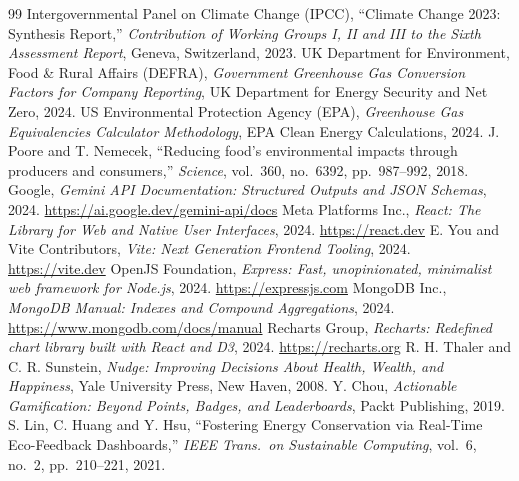 \documentclass[12pt,a4paper]{article}
\begin{document}
\begin{thebibliography}{99}
 Intergovernmental Panel on Climate Change (IPCC), ``Climate Change 2023: Synthesis Report,'' \emph{Contribution of Working Groups I, II and III to the Sixth Assessment Report}, Geneva, Switzerland, 2023.
 UK Department for Environment, Food \& Rural Affairs (DEFRA), \emph{Government Greenhouse Gas Conversion Factors for Company Reporting}, UK Department for Energy Security and Net Zero, 2024.
 US Environmental Protection Agency (EPA), \emph{Greenhouse Gas Equivalencies Calculator Methodology}, EPA Clean Energy Calculations, 2024.
 J. Poore and T. Nemecek, ``Reducing food's environmental impacts through producers and consumers,'' \emph{Science}, vol.\ 360, no.\ 6392, pp.\ 987--992, 2018.
 Google, \emph{Gemini API Documentation: Structured Outputs and JSON Schemas}, 2024. \url{https://ai.google.dev/gemini-api/docs}
 Meta Platforms Inc., \emph{React: The Library for Web and Native User Interfaces}, 2024. \url{https://react.dev}
 E. You and Vite Contributors, \emph{Vite: Next Generation Frontend Tooling}, 2024. \url{https://vite.dev}
 OpenJS Foundation, \emph{Express: Fast, unopinionated, minimalist web framework for Node.js}, 2024. \url{https://expressjs.com}
 MongoDB Inc., \emph{MongoDB Manual: Indexes and Compound Aggregations}, 2024. \url{https://www.mongodb.com/docs/manual}
 Recharts Group, \emph{Recharts: Redefined chart library built with React and D3}, 2024. \url{https://recharts.org}
 R. H. Thaler and C. R. Sunstein, \emph{Nudge: Improving Decisions About Health, Wealth, and Happiness}, Yale University Press, New Haven, 2008.
 Y. Chou, \emph{Actionable Gamification: Beyond Points, Badges, and Leaderboards}, Packt Publishing, 2019.
 S. Lin, C. Huang and Y. Hsu, ``Fostering Energy Conservation via Real-Time Eco-Feedback Dashboards,'' \emph{IEEE Trans.\ on Sustainable Computing}, vol.\ 6, no.\ 2, pp.\ 210--221, 2021.
\end{thebibliography}
\end{document}
